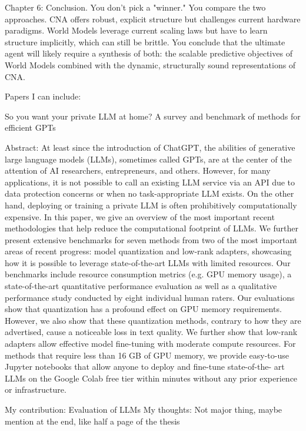 Chapter 6: Conclusion. You don't pick a "winner." You compare the two approaches. CNA offers robust, explicit structure but challenges current hardware paradigms. World Models leverage current scaling laws but have to learn structure implicitly, which can still be brittle. You conclude that the ultimate agent will likely require a synthesis of both: the scalable predictive objectives of World Models combined with the dynamic, structurally sound representations of CNA.






Papers I can include:



So you want your private LLM at home? A survey and benchmark of methods for efficient GPTs

Abstract: At least since the introduction of ChatGPT, the
abilities of generative large language models (LLMs), sometimes
called GPTs, are at the center of the attention of AI researchers,
entrepreneurs, and others. However, for many applications, it
is not possible to call an existing LLM service via an API due
to data protection concerns or when no task-appropriate LLM
exists. On the other hand, deploying or training a private LLM is
often prohibitively computationally expensive. In this paper, we
give an overview of the most important recent methodologies that
help reduce the computational footprint of LLMs. We further
present extensive benchmarks for seven methods from two of
the most important areas of recent progress: model quantization
and low-rank adapters, showcasing how it is possible to leverage
state-of-the-art LLMs with limited resources. Our benchmarks
include resource consumption metrics (e.g. GPU memory usage),
a state-of-the-art quantitative performance evaluation as well as
a qualitative performance study conducted by eight individual
human raters. Our evaluations show that quantization has a
profound effect on GPU memory requirements. However, we also
show that these quantization methods, contrary to how they are
advertised, cause a noticeable loss in text quality. We further
show that low-rank adapters allow effective model fine-tuning
with moderate compute resources. For methods that require less
than 16 GB of GPU memory, we provide easy-to-use Jupyter
notebooks that allow anyone to deploy and fine-tune state-of-the-
art LLMs on the Google Colab free tier within minutes without
any prior experience or infrastructure.

My contribution: Evaluation of LLMs
My thoughts: Not major thing, maybe mention at the end, like half a page of the thesis





